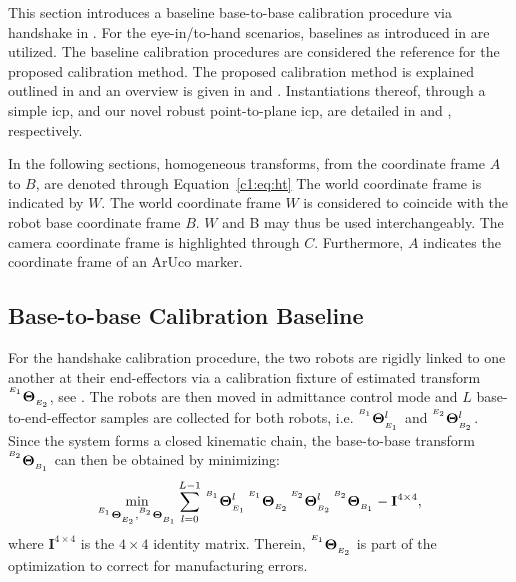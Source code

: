 This section introduces a baseline base-to-base calibration procedure via handshake in . For the eye-in/to-hand scenarios, baselines as introduced in  are utilized. The baseline calibration procedures are considered the reference for the proposed calibration method. The proposed calibration method is explained outlined in  and an overview is given in  and . Instantiations thereof, through a simple \gls{icp}, and our novel robust point-to-plane \gls{icp}, are detailed in  and , respectively.

In the following sections, homogeneous transforms, from the coordinate frame $A$ to $B$, are denoted through Equation~\ref{c1:eq:ht}
The world coordinate frame is indicated by $W$. The world coordinate frame $W$ is considered to coincide with the robot base coordinate frame $B$. $W$ and B may thus be used interchangeably. The camera coordinate frame is highlighted through $C$. Furthermore, $A$ indicates the coordinate frame of an ArUco marker.

\subsection{Base-to-base Calibration Baseline}
\label{c1:sec:handshake_calibration}
For the handshake calibration procedure, the two robots are rigidly linked to one another at their end-effectors via a calibration fixture of estimated transform ${}^{^{E_1}}\mathbf{\Theta}_{_{E_2}}$, see . The robots are then moved in admittance control mode and $L$ base-to-end-effector samples are collected for both robots, i.e. ${}^{^{B_1}}\mathbf{\Theta}_{_{E_1}}^l$ and ${}^{^{E_2}}\mathbf{\Theta}_{_{B_2}}^l$. Since the system forms a closed kinematic chain, the base-to-base transform ${}^{^{B_2}}\mathbf{\Theta}_{_{B_1}}$ can then be obtained by minimizing:
%
\begin{equation}
    \label{c1:eq:handsake}
    \min_{{}^{^{E_1}}\mathbf{\Theta}_{_{E_2}}, {}^{^{B_2}}\mathbf{\Theta}_{_{B_1}}} \sum_{l=0}^{L-1}\,{}^{^{B_1}}\mathbf{\Theta}_{_{E_1}}^l\,{}^{^{E_1}}\mathbf{\Theta}_{_{E_2}}\,{}^{^{E_2}}\mathbf{\Theta}_{_{B_2}}^l\,{}^{^{B_2}}\mathbf{\Theta}_{_{B_1}} - \mathbf{I}^{4\times4},
\end{equation}
%
where $\mathbf{I}^{4\times4}$ is the $4\times4$ identity matrix. Therein, ${}^{^{E_1}}\mathbf{\Theta}_{_{E_2}}$ is part of the optimization to correct for manufacturing errors.


